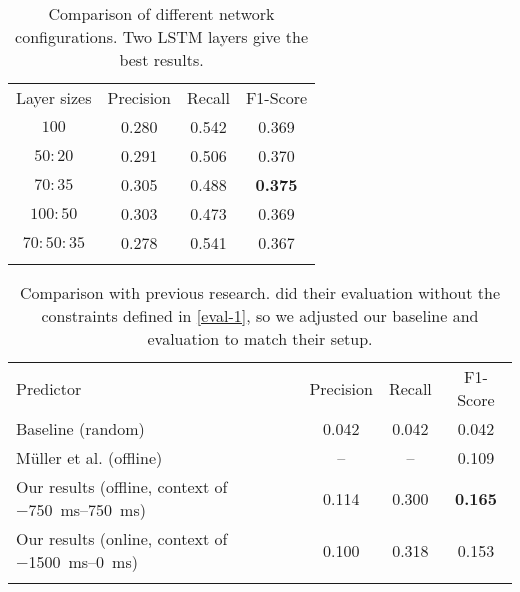 \begin{table}
    \centering
    \begin{tabular}{cccc}
    \hline\noalign{\smallskip}
    Layer sizes & Precision & Recall & F1-Score \\
    \noalign{\smallskip}\svhline\noalign{\smallskip}
    $100$ & 0.280 & 0.542 & 0.369 \\
    $50 : 20$ & 0.291 & 0.506 & 0.370 \\
    $70 : 35$ & 0.305 & 0.488 & \bf{0.375} \\
    $100 : 50$ & 0.303 & 0.473 & 0.369 \\
    $70 : 50 : 35$ & 0.278 & 0.541 & 0.367 \\
    \noalign{\smallskip}\hline\noalign{\smallskip}
    \end{tabular}
    \caption{Comparison of different network configurations. Two LSTM layers give the best results.}\label{tbl:varylayers}
\end{table}

\begin{table}
    \centering
    \begin{tabular}{p{7cm}ccc}
    \hline\noalign{\smallskip}
        Predictor & Precision & Recall & F1-Score \\
        \noalign{\smallskip}\svhline\noalign{\smallskip}
        Baseline (random) & 0.042 & 0.042 & 0.042 \\
        Müller et al. (offline) \cite{mueller_using_2015} & -- & -- & 0.109 \\
        Our results (offline, context of \SIrange{-750}{750}{ms}) & 0.114 & 0.300 & \bf{0.165} \\
        Our results (online, context of \SIrange{-1500}{0}{ms}) & 0.100 & 0.318 & 0.153 \\
    \noalign{\smallskip}\hline\noalign{\smallskip}
    \end{tabular}
    \caption{Comparison with previous research. \cite{mueller_using_2015} did their evaluation without the constraints defined in \autoref{eval-1}, so we adjusted our baseline and evaluation to match their setup.\label{tbl:mueller}}
\end{table}

